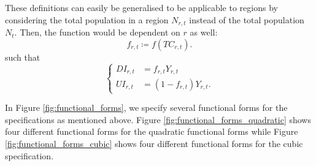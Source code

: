 \documentclass[12pt]{article}
\begin{document}
	These definitions can easily be generalised to be applicable to regions by considering the total population in a region $N_{r,t}$ instead of the total population $N_t$. Then, the function would be dependent on $r$ as well: 
	\begin{equation} \label{eq:f_rt}
	f_{r,t} \coloneqq f(TC_{r,t}).
	\end{equation}
	such that
	\begin{equation*}
	    \begin{cases}
	        DI_{r,t} &= f_{r,t}Y_{r,t} \\
	        UI_{r,t} &= (1-f_{r,t})Y_{r,t}.
	    \end{cases}
	\end{equation*}
	
	In Figure \ref{fig:functional_forms}, we specify several functional forms for the specifications as mentioned above. Figure \ref{fig:functional_forms_quadratic} shows four different functional forms for the quadratic functional forms while Figure \ref{fig:functional_forms_cubic} shows four different functional forms for the cubic specification. \\
	
	\def\N{100}
	\def\fmin{0.1}
	
\end{document}
